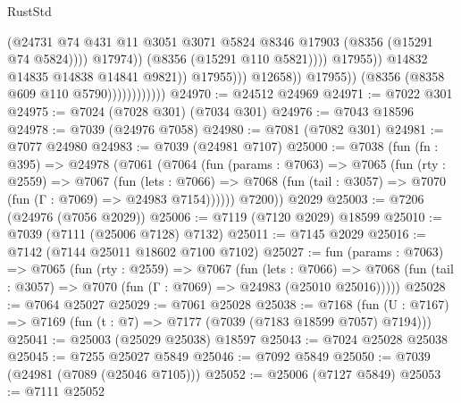 \begin{lexlean}{RustStd}
\begin{coremodule}
                                                        (@24731
                                                          @74
                                                          @431
                                                          @11
                                                          @3051
                                                          @3071
                                                          @5824
                                                          @8346
                                                          @17903
                                                          (@8356 (@15291 @74 @5824))))
                                                      @17974))
                                                  (@8356 (@15291 @110 @5821))))
                                              @17955))
                                          @14832
                                          @14835
                                          @14838
                                          @14841
                                          @9821))
                                      @17955)))
                                @12658))
                            @17955))
                        (@8356 (@8358 @609 @110 @5790))))))))))))
@24970 := @24512 @24969
@24971 := @7022 @301
@24975 := @7024 (@7028 @301) (@7034 @301)
@24976 := @7043 @18596
@24978 := @7039 (@24976 @7058)
@24980 := @7081 (@7082 @301)
@24981 := @7077 @24980
@24983 := @7039 (@24981 @7107)
@25000 := @7038
    (fun (fn : @395) =>
    @24978
      (@7061
        (@7064
          (fun (params : @7063) =>
          @7065
            (fun (rty : @2559) =>
            @7067
              (fun (lets : @7066) =>
              @7068 (fun (tail : @3057) => @7070 (fun (Γ : @7069) => @24983 @7154))))))
        @7200))
    @2029
@25003 := @7206 (@24976 (@7056 @2029))
@25006 := @7119 (@7120 @2029) @18599
@25010 := @7039 (@7111 (@25006 @7128) @7132)
@25011 := @7145 @2029
@25016 := @7142 (@7144 @25011 @18602 @7100 @7102)
@25027 := fun (params : @7063) =>
  @7065
    (fun (rty : @2559) =>
    @7067
      (fun (lets : @7066) =>
      @7068 (fun (tail : @3057) => @7070 (fun (Γ : @7069) => @24983 (@25010 @25016)))))
@25028 := @7064 @25027
@25029 := @7061 @25028
@25038 := @7168
    (fun (U : @7167) => @7169 (fun (t : @7) => @7177 (@7039 (@7183 @18599 @7057) @7194)))
@25041 := @25003 (@25029 @25038) @18597
@25043 := @7024 @25028 @25038
@25045 := @7255 @25027 @5849
@25046 := @7092 @5849
@25050 := @7039 (@24981 (@7089 (@25046 @7105)))
@25052 := @25006 (@7127 @5849)
@25053 := @7111 @25052

\end{coremodule}
\end{lexlean}
